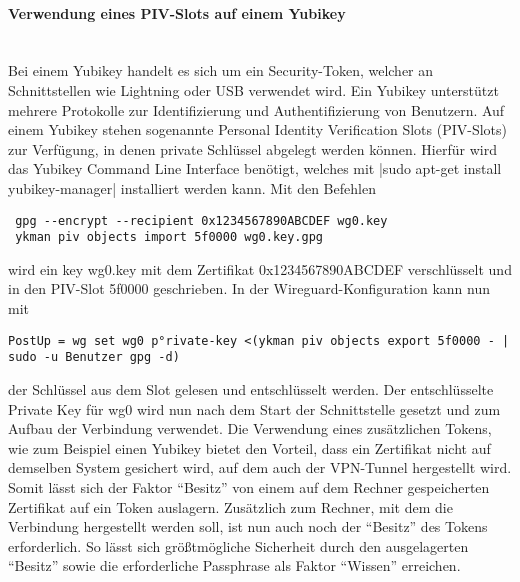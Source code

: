 \paragraph{Verwendung eines PIV-Slots auf einem Yubikey}
\noindent \\Bei einem Yubikey handelt es sich um ein Security-Token, welcher an Schnittstellen wie Lightning oder USB verwendet wird. Ein Yubikey unterst\"utzt mehrere Protokolle zur Identifizierung und Authentifizierung von Benutzern. Auf einem Yubikey stehen sogenannte Personal Identity Verification Slots (PIV-Slots) zur Verf\"ugung, in denen private Schl\"ussel abgelegt werden k\"onnen. Hierf\"ur wird das Yubikey Command Line Interface ben\"otigt, welches mit |sudo apt-get install yubikey-manager| installiert werden kann. Mit den Befehlen 
\begin{verbatim}
 gpg --encrypt --recipient 0x1234567890ABCDEF wg0.key
 ykman piv objects import 5f0000 wg0.key.gpg
\end{verbatim}
wird ein key wg0.key mit dem Zertifikat 0x1234567890ABCDEF verschl\"usselt und in den PIV-Slot 5f0000 geschrieben. In der Wireguard-Konfiguration kann nun mit
\begin{verbatim}
PostUp = wg set wg0 p°rivate-key <(ykman piv objects export 5f0000 - | sudo -u Benutzer gpg -d)
\end{verbatim}
der Schl\"ussel aus dem Slot gelesen und entschl\"usselt werden. Der entschl\"usselte Private Key für wg0 wird nun nach dem Start der Schnittstelle gesetzt  und zum Aufbau der Verbindung verwendet. Die Verwendung eines zusätzlichen Tokens, wie zum Beispiel einen Yubikey bietet den Vorteil, dass ein Zertifikat nicht auf demselben System gesichert wird, auf dem auch der VPN-Tunnel hergestellt wird. Somit lässt sich der Faktor "`Besitz"' von einem auf dem Rechner gespeicherten Zertifikat auf ein Token auslagern. Zusätzlich zum Rechner, mit dem die Verbindung hergestellt werden soll, ist nun auch noch der "`Besitz"' des Tokens erforderlich. So lässt sich größtmögliche Sicherheit durch den ausgelagerten "`Besitz"' sowie die erforderliche Passphrase als Faktor "`Wissen"' erreichen.  

